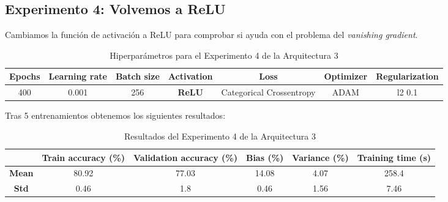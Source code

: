 \documentclass{article}
\begin{document}
		\subsection{Experimento 4: Volvemos a ReLU}
		\label{s-a3-e4}
			Cambiamos la funci\'on de activaci\'on a ReLU para comprobar si ayuda con el problema del \textit{vanishing gradient}.
			\begin{table}[!h]
				\begin{tabular}{| c | c | c | c | c | c | c |}
					\textbf{Epochs} & \textbf{Learning rate} & \textbf{Batch size} & \textbf{Activation} & \textbf{Loss} & \textbf{Optimizer} & \textbf{Regularization} \\ \hline
					400 & 0.001 & 256 & \textbf{ReLU} & Categorical Crossentropy & ADAM & l2 0.1
				\end{tabular}
				\caption{Hiperpar\'ametros para el Experimento 4 de la Arquitectura 3}
				\label{tab:hip-a3-e4}
			\end{table}
			\newpage			
			Tras 5 entrenamientos obtenemos los siguientes resultados:
			\begin{table}[!h]
				\begin{center}
					\begin{tabular}{ c | c | c | c | c | c |}
						\ & \textbf{Train accuracy (\%)} & \textbf{Validation accuracy (\%)} & \textbf{Bias (\%)} & \textbf{Variance (\%)} & \textbf{Training time (s)} \\ \hline
						\textbf{Mean} & 80.92 & 77.03 & 14.08 & 4.07 & 258.4 \\ \hline
						\textbf{Std} & 0.46 & 1.8 & 0.46 & 1.56 & 7.46 \\ \hline
					\end{tabular}
					\caption{Resultados del Experimento 4 de la Arquitectura 3}
					\label{tab:res-a3-e4}
				\end{center}
			\end{table}
			
\end{document}
